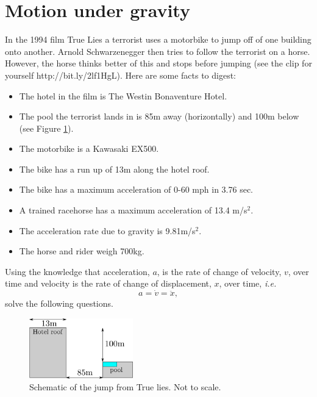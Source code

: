 \documentclass[10pt]{article}
\newcommand{\bb}{\begin{equation}}
\newcommand{\ee}{\end{equation}}
\newcommand{\see}[1]{(see Figure \ref{#1})}
\newcommand{\ie}{\emph{i.e.} }
\begin{document}
\section{Motion under gravity}
In the 1994 film True Lies a terrorist uses a motorbike to jump off of one building onto another. Arnold Schwarzenegger then tries to follow the terrorist on a horse. However, the horse thinks better of this and stops before jumping (see the clip for yourself http://bit.ly/2lf1HgL). Here are some facts to digest:
\begin{itemize}
\item The hotel in the film is The Westin Bonaventure Hotel. 
\item The pool the terrorist lands in is 85m away (horizontally) and 100m below \see{True_lies}.
\item The motorbike is a Kawasaki EX500.
\item The bike has a run up of 13m along the hotel roof.
\item The bike has a maximum acceleration of 0-60 mph in 3.76 sec.
\item A trained racehorse has a maximum acceleration of 13.4 m/s$^2$.
\item The acceleration rate due to gravity is 9.81m/s$^2$.
\item The horse and rider weigh 700kg.
\end{itemize}
Using the knowledge that acceleration, $a$, is the rate of change of velocity, $v$, over time and velocity is the rate of change of displacement, $x$, over time, \ie
\bb
a=\dot{v}=\ddot{x},
\ee
solve the following questions.
\begin{figure}[h!!!tb]
\centering
\includegraphics[width=0.4\textwidth]{../../Pictures/True_lies.png}
\caption{\label{True_lies} Schematic of the jump from True lies. Not to scale.}
\end{figure}
\end{document}
